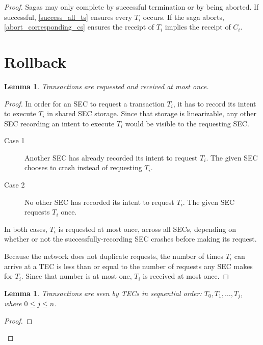 \documentclass{article}
\newtheorem{lemma}[theorem]{Lemma}
\begin{document}
\begin{proof}

Sagas may only complete by successful termination or by being aborted. If
successful, \ref{success_all_ts} ensures every $T_i$ occurs. If the saga
aborts, \ref{abort_corresponding_cs} ensures the receipt of $T_i$ implies the
receipt of $C_i$.

\section{Rollback}

\begin{lemma}
\label{t_at_most_once}
Transactions are requested and received at most once.
\end{lemma}

\begin{proof}

In order for an SEC to request a transaction $T_i$, it has to record its intent
to execute $T_i$ in shared SEC storage. Since that storage is linearizable, any
other SEC recording an intent to execute $T_i$ would be visible to the
requesting SEC.

\begin{description}
  \item[Case 1] Another SEC has already recorded its intent to request $T_i$.
The given SEC chooses to crash instead of requesting $T_i$.
  \item[Case 2] No other SEC has recorded its intent to request $T_i$. The
given SEC requests $T_i$ once.
\end{description}

In both cases, $T_i$ is requested at most once, across all SECs, depending on
whether or not the successfully-recording SEC crashes before making its
request.

Because the network does not duplicate requests, the number of times $T_i$ can
arrive at a TEC is less than or equal to the number of requests any SEC makes
for $T_i$. Since that number is at most one, $T_i$ is received at most once.

\end{proof}


\begin{lemma}
\label{t_sequential}
Transactions are seen by TECs in sequential order: $T_0, T_1, \ldots, T_j$,
where $0 \le j \le n$.
\end{lemma}

\begin{proof}


\end{proof}
\end{proof}
\end{document}
